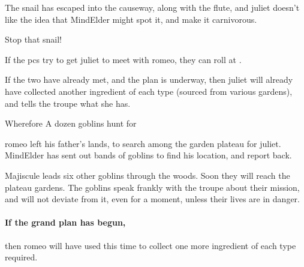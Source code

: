 The snail has escaped into the causeway, along with the flute, and \gls{juliet} doesn't like the idea that \gls{MindElder} might spot it, and make it carnivorous.

\begin{speechtext}
  Stop that snail!
\end{speechtext}

If the \glspl{pc} try to get \gls{juliet} to meet with \gls{romeo},
they can roll  at \tn[5].

If the two have already met, and the plan is underway,
then \gls{juliet} will already have collected another \gls{ingredient} of each type (sourced from various gardens), and tells the troupe what she has.

{Wherefore}%
{A dozen goblins hunt for }%

\Gls{romeo} left his father's lands, to search among the garden plateau for \gls{juliet}.
\Gls{MindElder} has sent out bands of goblins to find his location, and report back.

Majiscule leads six other goblins through the woods.
Soon they will reach the plateau gardens.
The goblins speak frankly with the troupe about their mission, and will not deviate from it, even for a moment, unless their lives are in danger.

\paragraph{If the grand plan has begun,}
then \gls{romeo} will have used this time to collect one more \gls{ingredient} of each type required.

